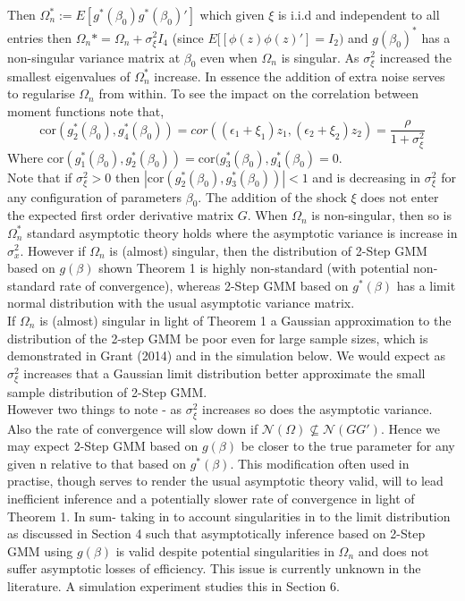 \documentclass[11pt, fleqn]{article}
\begin{document}
Then $\Omega_n^*:=E[ g^*(\beta_0) g^*(\beta_0)']$ which given $\xi$ is i.i.d and independent to all entries then $\Omega_n*=\Omega_n+\sigma^2_{\xi}I_4$ (since $E[[\phi(z)\phi(z)']=I_2)$ and $g(\beta_0)^*$ has a   non-singular  variance matrix at $\beta_0$ even when $\Omega_n$ is singular.  As $\sigma^2_{\xi}$ increased the smallest eigenvalues of $\Omega_n^*$ increase. In essence the addition of extra noise serves
 to regularise $\Omega_n$ from within. To see the impact on the correlation between moment functions note that,
 \begin{equation} \textrm{cor}(g^*_2(\beta_0),g^*_4(\beta_0))=cor((\epsilon_1+\xi_1)z_1,(\epsilon_2+\xi_2)z_2)=\frac{\rho}{1+\sigma^2_{\xi}}\end{equation}
Where $ \textrm{cor}(g^*_1(\beta_0),g^*_2(\beta_0))= \textrm{cor}(g^*_3(\beta_0),g^*_4(\beta_0)=0$.\\
Note that if $\sigma^2_{\xi}>0$ then $| \textrm{cor}(g^*_2(\beta_0),g^*_3(\beta_0))|<1$ and is decreasing in $\sigma^2_\xi$ for any configuration of parameters $\beta_0$.  The addition of the shock $\xi$ does not enter the expected first order derivative matrix $G$. When $\Omega_n$ is non-singular, then so is $\Omega_n^*$ standard asymptotic theory holds where the asymptotic variance is increase in $\sigma^2_x$. However if $\Omega_n$ is  (almost) singular, then the distribution of 2-Step GMM  based on $g(\beta)$  shown Theorem 1 is highly non-standard (with potential non-standard rate of convergence), whereas 2-Step GMM based on $g^*(\beta)$ has a limit normal distribution with the usual asymptotic variance matrix.\\
If $\Omega_n$ is (almost) singular in light of Theorem 1 a Gaussian approximation to the distribution of the 2-step GMM be poor even for large sample sizes, which is demonstrated in Grant (2014) and in the simulation below. We would expect as $\sigma^2_{\xi}$ increases that a Gaussian limit distribution better approximate the small sample distribution  of 2-Step GMM.\\
  However two things to note - as $\sigma^2_{\xi}$ increases so does the asymptotic variance. Also the rate of convergence will slow down if $\mathcal{N}(\Omega) \nsubseteq \mathcal{N}(GG')$. Hence we may expect 2-Step GMM based on $g(\beta)$ be closer to the true parameter for any given n relative to that based on $g^*(\beta)$.  This modification often used in practise, though serves to render the usual asymptotic theory valid,  will to lead inefficient inference and a potentially slower rate of convergence in light of Theorem 1. In sum- taking in to account singularities in to the limit distribution as discussed in Section 4 such that asymptotically inference based on 2-Step GMM using $g(\beta)$ is valid despite potential singularities in $\Omega_n$ and does not suffer asymptotic losses of efficiency. This issue is currently unknown in the literature. A simulation experiment studies this in Section 6.
\end{document}
